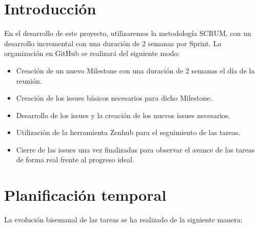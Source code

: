 
\section{Introducción}
En el desarrollo de este proyecto, utilizaremos la metodología SCRUM, con un desarrollo incremental con una duración de 2 semanas por Sprint. 
La organización en GitHub se realizará del siguiente modo: 
\begin{itemize}
\item Creación de un nuevo Milestone con una duración de 2 semanas el día de la reunión. 
\item Creación de los issues básicos necesarios para dicho Milestone. 
\item Desarrollo de los issues y la creación de los nuevos issues necesarios. 
\item Utilización de la herramienta Zenhub para el seguimiento de las tareas. 
\item Cierre de las issues una vez finalizadas para observar el avance de las tareas de forma real frente al progreso ideal. 
\end{itemize}

\section{Planificación temporal}
La evolución bisemanal de las tareas se ha realizado de la siguiente manera: 
